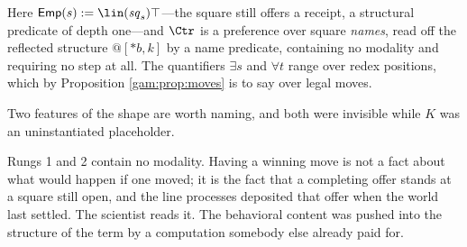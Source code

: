 \begin{center}
\end{center}

Here $\mathsf{Emp}(s) := \lin(\mathit{sq}_s)\top$---the square still offers a
receipt, a structural predicate of depth one---and $\Ctr$ is a preference over
square \emph{names}, read off the reflected structure $@[*b,k]$ by a name
predicate, containing no modality and requiring no step at all. The quantifiers
$\exists s$ and $\forall t$ range over redex positions, which by Proposition
\ref{gam:prop:moves} is to say over legal moves.

Two features of the shape are worth naming, and both were invisible while $K$
was an uninstantiated placeholder.

\begin{observation}\label{gam:winning-blocking-perception-lookahead}
Rungs 1 and 2 contain no modality. Having a winning move is not a fact about
what would happen if one moved; it is the fact that a completing offer stands at
a square still open, and the line processes deposited that offer when the world
last settled. The scientist reads it. The behavioral content was pushed into
the structure of the term by a computation somebody else already paid for.
\end{observation}


